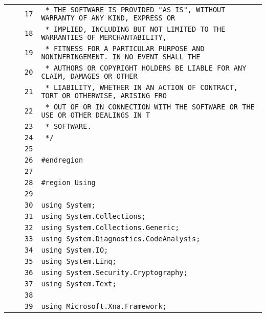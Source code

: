 \documentclass[a4paper,10pt]{article}
\begin{document}
\begin{longtable}[l]{lrrl}
\cellcolor{gray} &  & \verb~17~ & \verb~ * THE SOFTWARE IS PROVIDED "AS IS", WITHOUT WARRANTY OF ANY KIND, EXPRESS OR~\\
\cellcolor{gray} &  & \verb~18~ & \verb~ * IMPLIED, INCLUDING BUT NOT LIMITED TO THE WARRANTIES OF MERCHANTABILITY,~\\
\cellcolor{gray} &  & \verb~19~ & \verb~ * FITNESS FOR A PARTICULAR PURPOSE AND NONINFRINGEMENT. IN NO EVENT SHALL THE~\\
\cellcolor{gray} &  & \verb~20~ & \verb~ * AUTHORS OR COPYRIGHT HOLDERS BE LIABLE FOR ANY CLAIM, DAMAGES OR OTHER~\\
\cellcolor{gray} &  & \verb~21~ & \verb~ * LIABILITY, WHETHER IN AN ACTION OF CONTRACT, TORT OR OTHERWISE, ARISING FRO~\\
\cellcolor{gray} &  & \verb~22~ & \verb~ * OUT OF OR IN CONNECTION WITH THE SOFTWARE OR THE USE OR OTHER DEALINGS IN T~\\
\cellcolor{gray} &  & \verb~23~ & \verb~ * SOFTWARE.~\\
\cellcolor{gray} &  & \verb~24~ & \verb~ */~\\
\cellcolor{gray} &  & \verb~25~ & \verb~~\\
\cellcolor{gray} &  & \verb~26~ & \verb~#endregion~\\
\cellcolor{gray} &  & \verb~27~ & \verb~~\\
\cellcolor{gray} &  & \verb~28~ & \verb~#region Using~\\
\cellcolor{gray} &  & \verb~29~ & \verb~~\\
\cellcolor{gray} &  & \verb~30~ & \verb~using System;~\\
\cellcolor{gray} &  & \verb~31~ & \verb~using System.Collections;~\\
\cellcolor{gray} &  & \verb~32~ & \verb~using System.Collections.Generic;~\\
\cellcolor{gray} &  & \verb~33~ & \verb~using System.Diagnostics.CodeAnalysis;~\\
\cellcolor{gray} &  & \verb~34~ & \verb~using System.IO;~\\
\cellcolor{gray} &  & \verb~35~ & \verb~using System.Linq;~\\
\cellcolor{gray} &  & \verb~36~ & \verb~using System.Security.Cryptography;~\\
\cellcolor{gray} &  & \verb~37~ & \verb~using System.Text;~\\
\cellcolor{gray} &  & \verb~38~ & \verb~~\\
\cellcolor{gray} &  & \verb~39~ & \verb~using Microsoft.Xna.Framework;~\\

\end{longtable}
\end{document}

